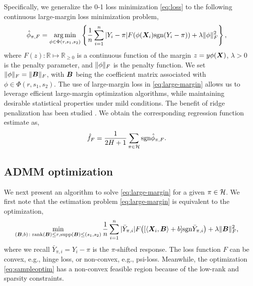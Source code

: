 \documentclass[11pt]{article}
\theoremstyle{plain}
\theoremstyle{definition}
\def\sign{\textup{sgn}}
\def\rank{\textup{rank}}
\begin{document}
Specifically, we generalize the 0-1 loss minimization \eqref{eq:loss} to the following continuous large-margin loss minimization problem, 
\begin{align}\label{eq:large-margin}
\hat \phi_{\pi, F} = \argmin_{\phi \in\Phi(r,s_1,s_2)}\left\{ {1\over n}\sum_{i=1}^n |Y_i-\pi|F(\phi(\mX_i)\sign(Y_i-\pi))+ \lambda \FnormSize{}{\phi}^2\right\},
\end{align}
where $F(z)\colon \mathbb{R}\mapsto \mathbb{R}_{\geq 0}$ is a continuous function of the margin $z=y\phi(\bm X)$, $\lambda>0$ is the penalty parameter, and $\lVert\phi\rVert_F$ is the penalty function. We set $\lVert\phi\rVert_F=\lVert\bm B\rVert_F$, with $\bm B$ being the coefficient matrix associated with $\phi\in\Phi(r,s_1,s_2)$. The use of large-margin loss in \eqref{eq:large-margin} allows us to leverage efficient large-margin optimization algorithms, while maintaining desirable statistical properties under mild conditions. The benefit of ridge penalization has been studied \citep{shen2003psi}. We obtain the corresponding regression function estimate as, 
\begin{equation}\label{eq:stepfunction-large-margin}
\hat f_{F} = {1\over 2H+1}\sum_{\pi \in \tH} \sign \hat \phi_{\pi, F}.
\end{equation}



\subsection{ADMM optimization}

We next present an algorithm to solve \eqref{eq:large-margin} for a given $\pi\in\mathcal{H}$. We first note that the estimation problem \eqref{eq:large-margin} is equivalent to the optimization,
\begin{equation}\label{eq:sampleoptim}
\min_{\substack{(\mB,b)\colon  \rank(\mB)\leq r, \text{supp}(\mB)\leq (s_1,s_2)}}{1\over n}\sum_{i=1}^n|\bar Y_{\pi, i}| F\big( [\langle \mX_i,\mB \rangle+b] \sign \bar Y_{\pi, i}\big) + \lambda\FnormSize{}{\mB}^2,
\end{equation}
where we recall $\bar Y_{\pi, i}=Y_i-\pi$ is the $\pi$-shifted response. The loss function $F$ can be convex, e.g., hinge loss, or non-convex, e.g., psi-loss. Meanwhile, the optimization \eqref{eq:sampleoptim} has a non-convex feasible region because of the low-rank and sparsity constraints. 
\end{document}
